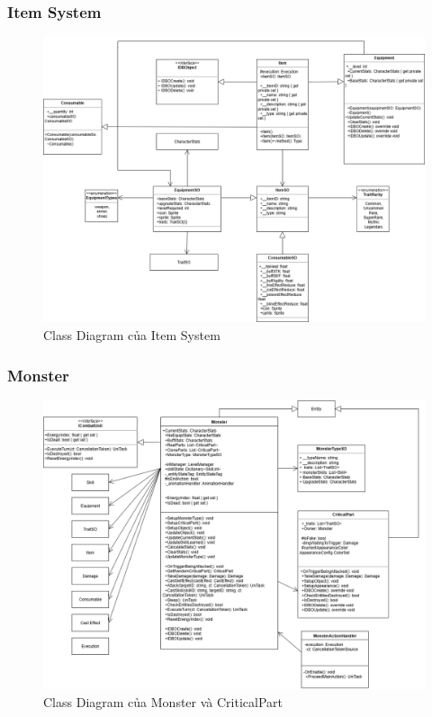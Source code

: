 \subsubsection{Item System}
\begin{figure}[H]
	\centering
	\includegraphics[width=\textwidth]{Images/CD/ItemCD.drawio.png}
	\vspace{0.5cm}
	\caption{Class Diagram của Item System}
\end{figure}
\subsubsection{Monster}
\begin{figure}[H]
	\centering
	\includegraphics[width=\textwidth]{Images/CD/monsterCD.drawio.png}
	\vspace{0.5cm}
	\caption{Class Diagram của Monster và CriticalPart}
\end{figure}
